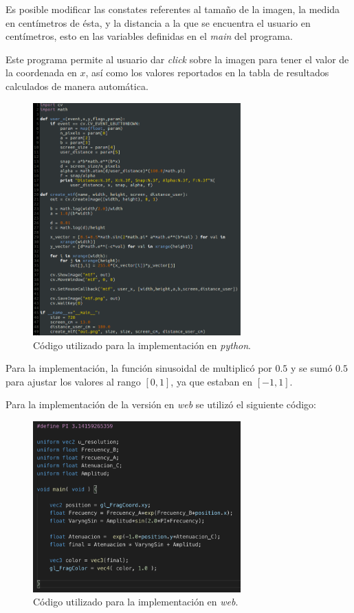 \documentclass[conference]{IEEEtran}
\begin{document}
Es posible modificar las constates referentes al tamaño de la imagen, la medida en centímetros de ésta, y la distancia a la que se encuentra el usuario en centímetros, esto en las variables definidas en el \textit{main} del programa.

Este programa permite al usuario dar \textit{click} sobre la imagen para tener el valor de la coordenada en $x$, así como los valores reportados en la tabla de resultados calculados de manera automática.

\begin{figure}[htbp]
\centerline{\includegraphics[width=80mm]{code/code1}}
\caption{Código utilizado para la implementación en \textit{python}.}
\label{code1}
\end{figure}

Para la implementación, la función sinusoidal de multiplicó por $0.5$ y se sumó $0.5$ para ajustar los valores al rango  $[0,1]$, ya que estaban en $[-1,1]$.


Para la implementación de la versión en \textit{web} se utilizó el siguiente código:

\begin{figure}[htbp]
\centerline{\includegraphics[width=80mm]{code/shaderCode}}
\caption{Código utilizado para la implementación en \textit{web}.}
\label{code2}
\end{figure}
\end{document}
